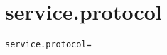 \section{service.protocol}
\label{configuration:ServiceProtocol}
\ClearAPI
\TODO
{}
\begin{lstlisting}[style=Props,caption={Usage example for \textit{service.protocol}}]
service.protocol=
\end{lstlisting}